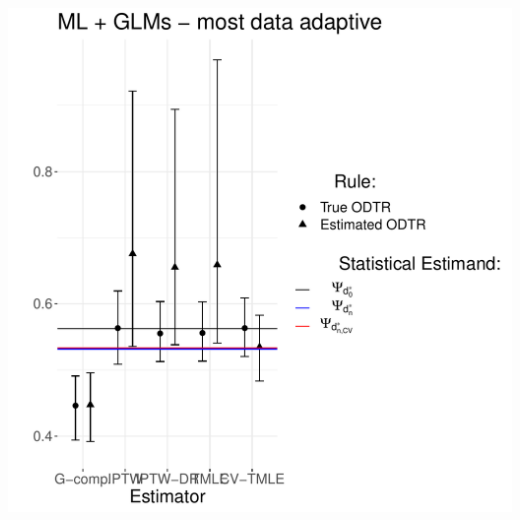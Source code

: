 \documentclass[11pt]{article}\usepackage[]{graphicx}\usepackage[]{color}
\makeatletter
\def\maxwidth{ %
  \ifdim\Gin@nat@width>\linewidth
    \linewidth
  \else
    \Gin@nat@width
  \fi
}
\newenvironment{knitrout}{}{} %
\makeatother
\begin{document}
\begin{knitrout}
\includegraphics[width=\maxwidth]{figure/unnamed-chunk-6-3} 

\end{knitrout}
\end{document}
